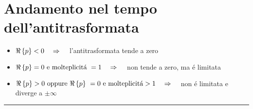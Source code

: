 \documentclass[../main.tex]{subfiles}
\begin{document}
	\section{Andamento nel tempo dell'antitrasformata}
	\begin{itemize}
		\item $ \Re \left\lbrace p \right\rbrace < 0 \quad \Rightarrow \quad $ l'antitrasformata tende a zero
		\item $ \re{p} = 0\ \text{e molteplicit\'{a}}\ = 1 \quad \Rightarrow \quad $ non tende a zero, ma \'{e} limitata
		\item $ \re{p} > 0\ \text{oppure}\ \re{p}\ = 0\ \text{e molteplicit\'{a}} > 1 \quad \Rightarrow \quad $ non \'{e} limitata e diverge a $ \pm \infty $
	\end{itemize}
	\rule{\linewidth}{0.4pt}
\end{document}
